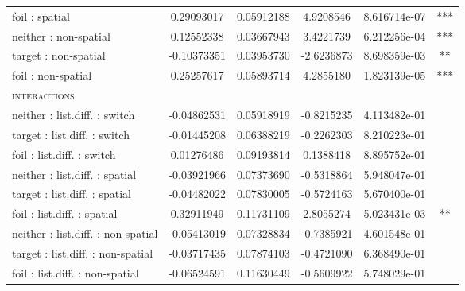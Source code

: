\begin{center}
\begin{longtable}{l S[table-format=>1.2] S[table-format=1.3] S[table-format=>1.2] S[round-precision=3,round-minimum=0.001,table-format=>1.3] c }
   foil : spatial                   &   0.29093017 &             0.05912188 &                    4.9208546 &            8.616714e-07 &     *** \\
neither : non-spatial               &   0.12552338 &             0.03667943 &                    3.4221739 &            6.212256e-04 &     *** \\
 target : non-spatial               &  -0.10373351 &             0.03953730 &                   -2.6236873 &            8.698359e-03 &      ** \\
   foil : non-spatial               &   0.25257617 &             0.05893714 &                    4.2855180 &            1.823139e-05 &     *** \\ \midrule
\scshape{interactions}              &              &                        &                              &                         &         \\
neither : list.diff. : switch       &  -0.04862531 &             0.05918919 &                   -0.8215235 &            4.113482e-01 &         \\
 target : list.diff. : switch       &  -0.01445208 &             0.06388219 &                   -0.2262303 &            8.210223e-01 &         \\
   foil : list.diff. : switch       &   0.01276486 &             0.09193814 &                    0.1388418 &            8.895752e-01 &         \\
neither : list.diff. : spatial      &  -0.03921966 &             0.07373690 &                   -0.5318864 &            5.948047e-01 &         \\
 target : list.diff. : spatial      &  -0.04482022 &             0.07830005 &                   -0.5724163 &            5.670400e-01 &         \\
   foil : list.diff. : spatial      &   0.32911949 &             0.11731109 &                    2.8055274 &            5.023431e-03 &      ** \\
neither : list.diff. : non-spatial  &  -0.05413019 &             0.07328834 &                   -0.7385921 &            4.601548e-01 &         \\
 target : list.diff. : non-spatial  &  -0.03717435 &             0.07874103 &                   -0.4721090 &            6.368490e-01 &         \\
   foil : list.diff. : non-spatial  &  -0.06524591 &             0.11630449 &                   -0.5609922 &            5.748029e-01 &         \\

\end{longtable}
\end{center}
